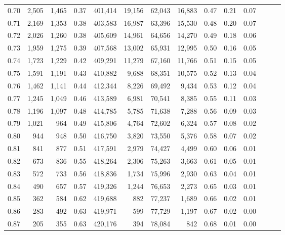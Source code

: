 \begin{tabular}{rrrrrrrrrrrrrr}
0.70 &   2,505 &  1,465 &  0.37 &  401,414 &   19,156 &  62,043 &  16,883 &  0.47 &  0.21 &      0.07 \\
0.71 &   2,169 &  1,353 &  0.38 &  403,583 &   16,987 &  63,396 &  15,530 &  0.48 &  0.20 &      0.07 \\
0.72 &   2,026 &  1,260 &  0.38 &  405,609 &   14,961 &  64,656 &  14,270 &  0.49 &  0.18 &      0.06 \\
0.73 &   1,959 &  1,275 &  0.39 &  407,568 &   13,002 &  65,931 &  12,995 &  0.50 &  0.16 &      0.05 \\
0.74 &   1,723 &  1,229 &  0.42 &  409,291 &   11,279 &  67,160 &  11,766 &  0.51 &  0.15 &      0.05 \\
0.75 &   1,591 &  1,191 &  0.43 &  410,882 &    9,688 &  68,351 &  10,575 &  0.52 &  0.13 &      0.04 \\
0.76 &   1,462 &  1,141 &  0.44 &  412,344 &    8,226 &  69,492 &   9,434 &  0.53 &  0.12 &      0.04 \\
0.77 &   1,245 &  1,049 &  0.46 &  413,589 &    6,981 &  70,541 &   8,385 &  0.55 &  0.11 &      0.03 \\
0.78 &   1,196 &  1,097 &  0.48 &  414,785 &    5,785 &  71,638 &   7,288 &  0.56 &  0.09 &      0.03 \\
0.79 &   1,021 &    964 &  0.49 &  415,806 &    4,764 &  72,602 &   6,324 &  0.57 &  0.08 &      0.02 \\
0.80 &     944 &    948 &  0.50 &  416,750 &    3,820 &  73,550 &   5,376 &  0.58 &  0.07 &      0.02 \\
0.81 &     841 &    877 &  0.51 &  417,591 &    2,979 &  74,427 &   4,499 &  0.60 &  0.06 &      0.01 \\
0.82 &     673 &    836 &  0.55 &  418,264 &    2,306 &  75,263 &   3,663 &  0.61 &  0.05 &      0.01 \\
0.83 &     572 &    733 &  0.56 &  418,836 &    1,734 &  75,996 &   2,930 &  0.63 &  0.04 &      0.01 \\
0.84 &     490 &    657 &  0.57 &  419,326 &    1,244 &  76,653 &   2,273 &  0.65 &  0.03 &      0.01 \\
0.85 &     362 &    584 &  0.62 &  419,688 &      882 &  77,237 &   1,689 &  0.66 &  0.02 &      0.01 \\
0.86 &     283 &    492 &  0.63 &  419,971 &      599 &  77,729 &   1,197 &  0.67 &  0.02 &      0.00 \\
0.87 &     205 &    355 &  0.63 &  420,176 &      394 &  78,084 &     842 &  0.68 &  0.01 &      0.00 \\

\end{tabular}
